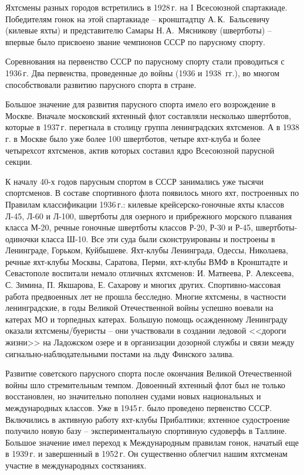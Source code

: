 \documentclass[a4paper, 12pt, twoside, final]{scrbook}
\begin{document}
Яхтсмены разных городов встретились в 1928\,г. на I Всесоюзной спартакиаде.
Победителям гонок на этой спартакиаде \--- кронштадтцу А.\,К.~Бальсевичу
(килевые яхты) и представителю Самары Н.\,А.~Мясникову (швертботы) \--- впервые было присвоено звание чемпионов СССР по парусному спорту.

Соревнования на первенство СССР по парусному спорту стали проводиться
с 1936\,г. Два первенства, проведенные до войны (1936 и 1938~гг.),
во многом способствовали развитию парусного спорта в стране.

Большое значение для развития парусного спорта имело его возрождение в
Москве. Вначале московский яхтенный флот составляли несколько швертботов,
которые в 1937\,г. перегнала в столицу группа ленинградских яхтсменов.
А в 1938\,г. в Москве было уже более 100 швертботов, четыре яхт-клуба
и более четырехсот яхтсменов, актив которых составил ядро Всесоюзной
парусной секции.

К началу 40-х годов парусным спортом в СССР занимались уже тысячи
спортсменов. В составе спортивного флота появилось много яхт, построенных
по Правилам классификации 1936\,г.: килевые крейсерско-гоночные яхты
классов Л-45, Л-60 и Л-100, швертботы для озерного и прибрежного морского
плавания класса М-20, речные гоночные швертботы классов Р-20, Р-30
и Р-45, швертботы-одиночки класса Ш-10. Все эти суда были сконструированы
и построены в Ленинграде, Горьком, Куйбышеве. Яхт-клубы Ленинграда,
Одессы, Николаева, речные яхт-клубы Москвы, Саратова, Перми, яхт-клубы ВМФ в Кронштадте и Севастополе воспитали немало отличных яхтсменов:
И. Матвеева, Р. Алексеева, С. Зимина, П. Якшарова, Е. Сахарову и многих
других. Спортивно-массовая работа предвоенных лет не прошла бесследно.
Многие яхтсмены, в частности ленинградские, в годы Великой Отечественной
войны успешно воевали на катерах МО и торпедных катерах. Большую помощь
осажденному Ленинграду оказали яхтсмены\-/буеристы \--- они участвовали в
создании ледовой <<дороги жизни>> на Ладожском озере и в организации
дозорной службы и связи между сигнально-наблюдательными постами на
льду Финского залива.

Развитие советского парусного спорта после окончания Великой Отечественной
войны шло стремительным темпом. Довоенный яхтенный флот был не только
восстановлен, но значительно пополнен судами новых национальных и
международных классов. Уже в 1945\,г. было проведено первенство СССР.
Включились в активную работу яхт-клубы Прибалтики; яхтенное судостроение
получило новую базу \--- экспериментальную спортивную судоверфь в Таллине.
Большое значение имел переход к Международным правилам гонок, начатый
еще в 1939\,г. и завершенный в 1952\,г. Он существенно облегчил нашим
яхтсменам участие в международных состязаниях.
\end{document}
